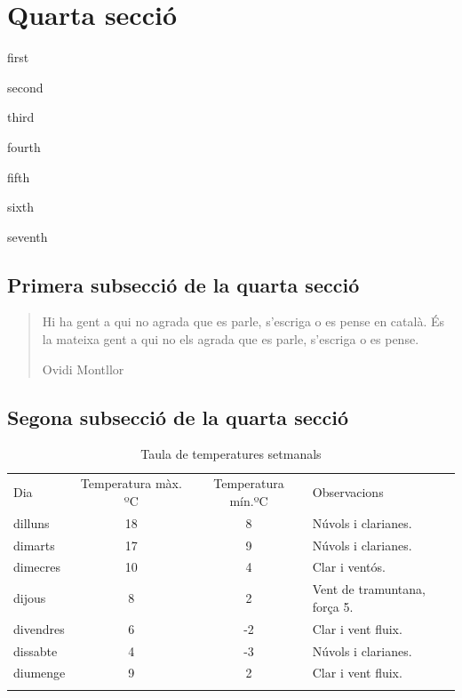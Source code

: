 \documentclass[a4paper,
                             twoside,
                             BCOR1.0cm,
                             DIV11,
                             parskip=full,
                             11pt]{scrbook}
\let\shline\hline
\def\hline{\noalign{\vskip3pt}\shline\noalign{\vskip4pt}}
\begin{document}
\section{Quarta secció}\label{sec:quarta}
\lipsum[1]
\begin{steps}
\item  first
\item  second
\item  third
\item  fourth
\item  fifth
\item  sixth
\item  seventh
\end{steps}
\subsection{Primera subsecció de la quarta secció}\label{sbsec:primera}
\lipsum[1-3]
\begin{quote}
Hi ha gent a qui no agrada que es parle, s’escriga o es pense en català. És la mateixa gent a qui no els agrada que es parle, s’escriga o es pense.

Ovidi Montllor
\end{quote}
\subsection{Segona subsecció de la quarta secció}\label{sbsec:segona}
\lipsum[4-5]
\begin{table}[h]
\centering\scriptsize
\begin{tabular}{l|c|c|l}
\hline
Dia & Temperatura màx. ºC & Temperatura mín.ºC & Observacions \\
\hline
dilluns   & 18 & 8 & Núvols i clarianes. \\
dimarts   & 17 & 9 & Núvols i clarianes. \\
dimecres  & 10 & 4 & Clar i ventós. \\
dijous    &  8 & 2 & Vent de tramuntana, força 5. \\
divendres &  6 & -2 & Clar i vent fluix. \\
dissabte  & 4 & -3 & Núvols i clarianes. \\
diumenge  & 9 & 2 &  Clar i vent fluix. \\
\hline
\end{tabular}
\caption{Taula de temperatures setmanals}\label{tab:temp2}
\end{table}
\lipsum[8-9]
\end{document}
